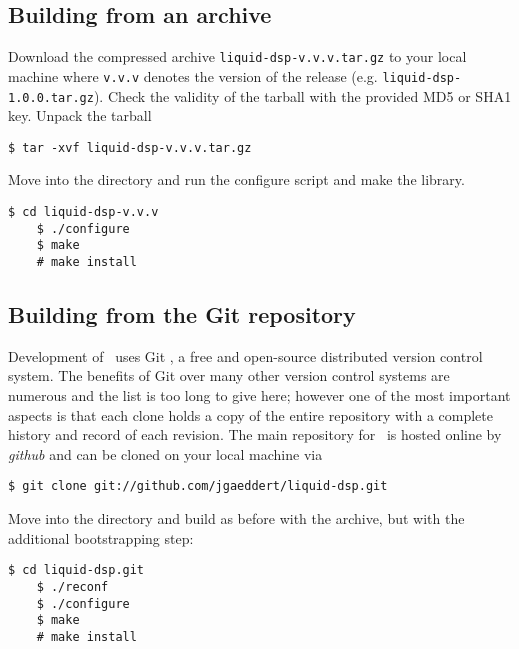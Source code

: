 \subsection{Building from an archive}
\label{section:installation:build_from_tarball}
Download the compressed archive {\tt liquid-dsp-v.v.v.tar.gz} to your
local machine where {\tt v.v.v} denotes the version of the release
(e.g. {\tt liquid-dsp-1.0.0.tar.gz}).
Check the validity of the tarball with the provided MD5 or SHA1 key.
%
%
%
%
Unpack the tarball
%
\begin{Verbatim}[fontsize=\small]
    $ tar -xvf liquid-dsp-v.v.v.tar.gz
\end{Verbatim}
%
Move into the directory and run the configure script and make the
library.
%
\begin{Verbatim}[fontsize=\small]
    $ cd liquid-dsp-v.v.v
    $ ./configure
    $ make
    # make install
\end{Verbatim}

\subsection{Building from the Git repository}
\label{section:installation:build_from_git}
Development of \liquid\ uses Git \cite{git:web}, a free and
open-source distributed version control system.
The benefits of Git over many other version control systems are
numerous and the list is too long to give here;
however one of the most important aspects is that each clone holds a
copy of the entire repository with a complete history and record of each
revision.
The main repository for \liquid\ is hosted online by {\em github}
\cite{github:web} and can be cloned on your local machine via
%
\begin{Verbatim}[fontsize=\small]
    $ git clone git://github.com/jgaeddert/liquid-dsp.git
\end{Verbatim}
%
Move into the directory and build as before with the archive,
but with the additional bootstrapping step:
%
\begin{Verbatim}[fontsize=\small]
    $ cd liquid-dsp.git
    $ ./reconf
    $ ./configure
    $ make
    # make install
\end{Verbatim}



